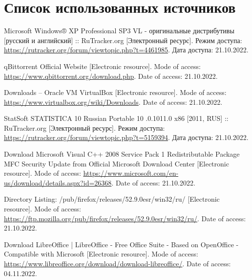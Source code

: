 \newpage

\begingroup
  \section*{Список использованных источников}

  \renewcommand{\addcontentsline}[3]{}%
  \renewcommand{\section}[2]{}%

  \begin{thebibliography}{}
    Microsoft Windows® XP Professional SP3 VL - оригинальные дистрибутивы [русский и английский] :: RuTracker.org
    [Электронный ресурс].
    Режим доступа: \url{https://rutracker.org/forum/viewtopic.php?t=4461985}.
    Дата доступа: 21.10.2022.

    qBittorrent Official Website
    [Electronic resource].
    Mode of access: \url{https://www.qbittorrent.org/download.php}.
    Date of access: 21.10.2022.

    Downloads – Oracle VM VirtualBox
    [Electronic resource].
    Mode of access: \url{https://www.virtualbox.org/wiki/Downloads}.
    Date of access: 21.10.2022.

    StatSoft STATISTICA 10 Russian Portable 10 .0.1011.0 x86 [2011, RUS] :: RuTracker.org
    [Электронный ресурс].
    Режим доступа: \url{https://rutracker.org/forum/viewtopic.php?t=5159394}.
    Дата доступа: 21.10.2022.
    
    Download Microsoft Visual C++ 2008 Service Pack 1 Redistributable Package MFC Security Update from Official Microsoft Download Center
    [Electronic resource].
    Mode of access: \url{https://www.microsoft.com/en-us/download/details.aspx?id=26368}.
    Date of access: 21.10.2022.

    Directory Listing: /pub/firefox/releases/52.9.0esr/win32/ru/
    [Electronic resource].
    Mode of access: \url{https://ftp.mozilla.org/pub/firefox/releases/52.9.0esr/win32/ru/}.
    Date of access: 21.10.2022.

    Download LibreOffice | LibreOffice - Free Office Suite - Based on OpenOffice - Compatible with Microsoft
    [Electronic resource].
    Mode of access: \url{https://www.libreoffice.org/download/download-libreoffice/}.
    Date of access: 04.11.2022.
  \end{thebibliography}
\endgroup


